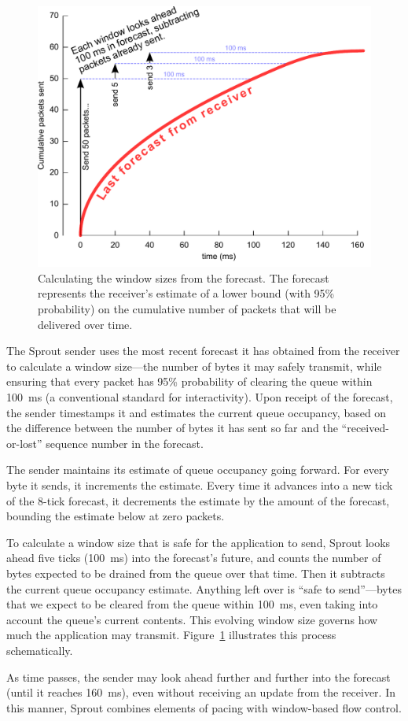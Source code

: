 \begin{figure}
\caption{Calculating the window sizes from the forecast. The forecast
  represents the receiver's estimate of a lower bound (with 95\%
  probability) on the cumulative number of packets that will be
  delivered over time.}

\hspace{\baselineskip}

\noindent\includegraphics[width=\columnwidth]{forecast.pdf}

\label{f:forecast}

\end{figure}

The Sprout sender uses the most recent forecast it has obtained from the
receiver to calculate a window size---the number of bytes it may
safely transmit, while ensuring that every packet has 95\% probability
of clearing the queue within 100~ms (a conventional standard for
interactivity). Upon receipt of the forecast, the sender timestamps it and
estimates the current queue occupancy, based on the difference between
the number of bytes it has sent so far and the ``received-or-lost''
sequence number in the forecast.

The sender maintains its estimate of queue occupancy going
forward. For every byte it sends, it increments the estimate. Every
time it advances into a new tick of the 8-tick forecast, it decrements
the estimate by the amount of the forecast, bounding the estimate
below at zero packets.

To calculate a window size that is safe for the application to send,
Sprout looks ahead five ticks (100~ms) into the forecast's future, and
counts the number of bytes expected to be drained from the queue over
that time. Then it subtracts the current queue occupancy
estimate. Anything left over is ``safe to send''---bytes that we
expect to be cleared from the queue within 100~ms, even taking into
account the queue's current contents. This evolving window size
governs how much the application may transmit. Figure~\ref{f:forecast}
illustrates this process schematically.

As time passes, the sender may look ahead further and further into the
forecast (until it reaches 160~ms), even without receiving an update
from the receiver. In this manner, Sprout combines elements of pacing
with window-based flow control.
